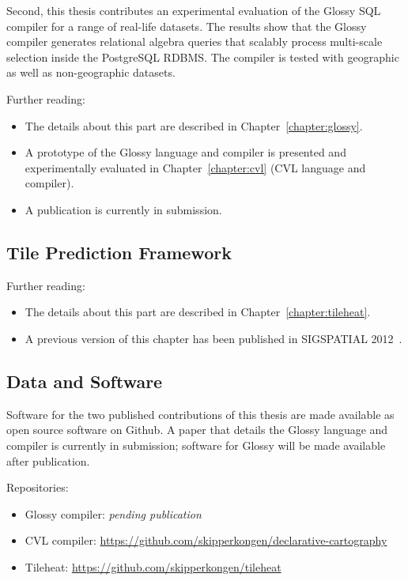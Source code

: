 \documentclass[11pt, oneside]{report}
\begin{document}
Second, this thesis contributes an experimental evaluation of the Glossy SQL compiler for a range of real-life datasets. The results show that the Glossy compiler generates relational algebra queries that scalably process multi-scale selection inside the PostgreSQL RDBMS. The compiler is tested with geographic as well as non-geographic datasets.

Further reading:
\vspace{-2ex}
\begin{itemize}
\item The details about this part are described in Chapter~\ref{chapter:glossy}.
\item A prototype of the Glossy language and compiler is presented and experimentally evaluated in Chapter~\ref{chapter:cvl} (CVL language and compiler).
\item A publication is currently in submission.
\end{itemize}


\subsection{Tile Prediction Framework}
\label{sec:introduction:contributions:tileheat}

Further reading:
\vspace{-2ex}
\begin{itemize}
\item The details about this part are described in Chapter~\ref{chapter:tileheat}.
\item A previous version of this chapter has been published in SIGSPATIAL 2012~\cite{kefaloukos2012tileheat}.
\end{itemize}



\subsection{Data and Software}

Software for the two published contributions of this thesis are made available as open source software on Github. A paper that details the Glossy language and compiler is currently in submission; software for Glossy will be made available after publication.

Repositories:

\vspace{-2ex}
\begin{itemize}
\item Glossy compiler: \emph{pending publication}
\item CVL compiler: \url{https://github.com/skipperkongen/declarative-cartography}
\item Tileheat: \url{https://github.com/skipperkongen/tileheat}
\end{itemize}
\end{document}
